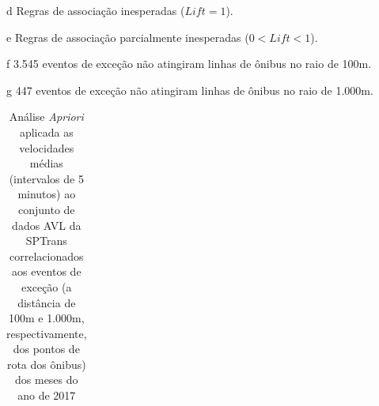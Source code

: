 \documentclass[
	12pt,				%
	oneside,			%
	a4paper,			%
	english,			%
	brazil				%
	]{abntex2ppgsi}
\begin{document}
{{\begin{table}[!htb]
\begin{threeparttable}
\begin{tablenotes}
            \item[d] Regras de associação inesperadas ($Lift = 1$).
            \item[e] Regras de associação parcialmente inesperadas ($0 < Lift < 1$).
            \item[f] 3.545 eventos de exceção não atingiram linhas de ônibus no raio de 100m.
            \item[g] 447 eventos de exceção não atingiram linhas de ônibus no raio de 1.000m.
        \end{tablenotes}
\end{threeparttable}
\end{table}

\begin{table}[!htb]
\centering
\begin{threeparttable}
\caption {Análise \textit{Apriori} aplicada as velocidades médias (intervalos de 5 minutos) ao conjunto de dados AVL da SPTrans correlacionados aos eventos de exceção (a distância de 100m e 1.000m, respectivamente, dos pontos de rota dos ônibus) dos meses do ano de 2017}
\label {tab:aprioriExceptFullShapes}
\begin{tabular}{c|c|c|c|c|c}
\toprule



\end{tabular}
\end{threeparttable}
\end{table}}}
\end{document}
